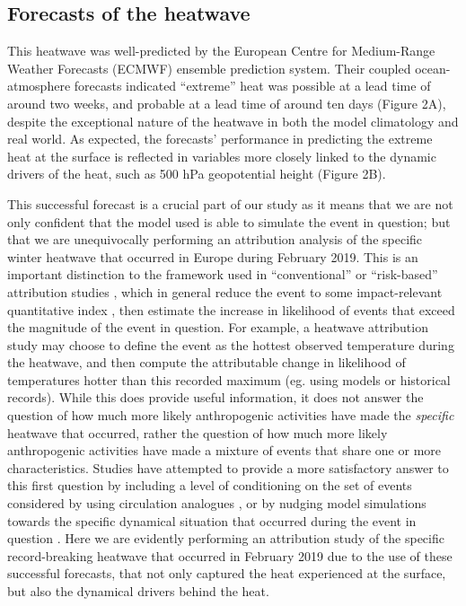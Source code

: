   \subsection{Forecasts of the heatwave}\label{Ch4:forecasts}

    This heatwave was well-predicted by the European Centre for Medium-Range Weather Forecasts (ECMWF) ensemble prediction system. Their coupled ocean-atmosphere forecasts indicated ``extreme'' heat was possible at a lead time of around two weeks, and probable at a lead time of around ten days (Figure 2A), despite the exceptional nature of the heatwave in both the model climatology and real world. As expected, the forecasts' performance in predicting the extreme heat at the surface is reflected in variables more closely linked to the dynamic drivers of the heat, such as 500 hPa geopotential height (Figure 2B). 
    
    This successful forecast is a crucial part of our study as it means that we are not only confident that the model used is able to simulate the event in question; but that we are unequivocally performing an attribution analysis of the specific winter heatwave that occurred in Europe during February 2019. This is an important distinction to the framework used in ``conventional'' or ``risk-based'' \citep{shepherd_common_2016} attribution studies \citep{stott_human_2004,pall_anthropogenic_2011,sparrow_attributing_2018,leach_anthropogenic_2020}, which in general reduce the event to some impact-relevant quantitative index , then estimate the increase in likelihood of events that exceed the magnitude of the event in question. For example, a heatwave attribution study may choose to define the event as the hottest observed temperature during the heatwave, and then compute the attributable change in likelihood of temperatures hotter than this recorded maximum (eg. using models or historical records). While this does provide useful information, it does not answer the question of how much more likely anthropogenic activities have made the \emph{specific} heatwave that occurred, rather the question of how much more likely anthropogenic activities have made a mixture of events that share one or more characteristics. Studies have attempted to provide a more satisfactory answer to this first question by including a level of conditioning on the set of events considered by using circulation analogues \citep{yiou_statistical_2017}, or by nudging model simulations towards the specific dynamical situation that occurred during the event in question \citep{meredith_crucial_2015,van_garderen_methodology_2021}. Here we are evidently performing an attribution study of the specific record-breaking heatwave that occurred in February 2019 due to the use of these successful forecasts, that not only captured the heat experienced at the surface, but also the dynamical drivers behind the heat.

